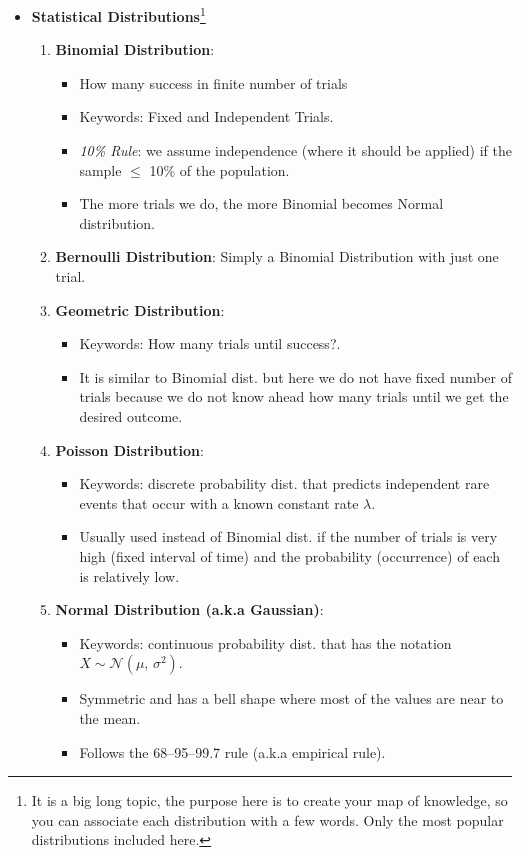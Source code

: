 \documentclass[11pt, twocolumn]{article}
\begin{document}
\begin{itemize}
\item \textbf{Statistical Distributions}\footnote{It is a big long topic, the purpose here is to create your map of knowledge, so you can associate each distribution with a few words. Only the most popular distributions included here.}
\begin{enumerate}
\item \textbf{Binomial Distribution}:
\begin{itemize}
\item How many success in finite number of trials
\item Keywords: {\color{blue} Fixed and Independent} Trials.	
\item \textit{10\% Rule}: we assume independence (where it should be applied) if the sample $\leq$ 10\% of the population.
\item The more trials we do, the more Binomial becomes Normal distribution.
\end{itemize} 

\item \textbf{Bernoulli Distribution}: Simply a Binomial Distribution with just {\color{blue} one} trial. 
\item \textbf{Geometric Distribution}: 
\begin{itemize}
\item  Keywords: {\color{blue} How many trials until success?}.
\item  It is similar to Binomial dist. but here we do not have fixed number of trials because we do not know ahead how many trials until we get the desired outcome.
\end{itemize}
	
\item \textbf{Poisson Distribution}: 
\begin{itemize}
\item  Keywords:  {\color{blue} discrete} probability dist. that predicts independent {\color{blue} rare} events that occur with a known {\color{blue}constant rate $\lambda$}.
\item  Usually used instead of Binomial dist. if the number of trials is {\color{blue} very high (fixed interval of time)} and the probability (occurrence) of each is {\color{blue} relatively low}.
\end{itemize}

\item \textbf{Normal Distribution (a.k.a Gaussian)}: 
\begin{itemize}
\item  Keywords: {\color{blue} continuous} probability dist. that has the notation  $X \sim \mathcal{N}(\mu,\,\sigma^{2})$. 
\item {\color{blue} Symmetric} and has a bell shape where most of the values are near to the mean.
\item Follows the 68–95–99.7 rule (a.k.a empirical rule).
\end{itemize}


\end{enumerate}
\end{itemize}
\end{document}
